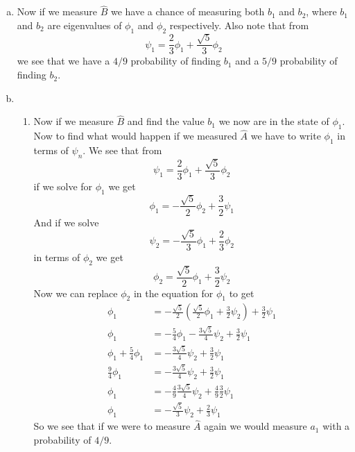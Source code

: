 \documentclass[11pt]{article}
\numberwithin{equation}{section}
\begin{document}
\begin{enumerate}[(a)]
\item
Now if we measure $\hat{B}$ we have a chance of measuring both $b_1$ and $b_2$, where $b_1$ and $b_2$ are eigenvalues of $\phi_1$ and $\phi_2$ respectively. Also note that from 
$$\psi_1 = \frac{2}{3}\phi_1+\frac{\sqrt{5}}{3}\phi_2$$
we see that we have a $4/9$ probability of finding $b_1$ and a $5/9$ probability of finding $b_2$.

\item
\begin{enumerate}[i]
\item
Now if we measure $\hat{B}$ and find the value $b_1$ we now are in the state of $\phi_1$. Now to find what would happen if we measured $\hat{A}$ we have to write $\phi_1$ in terms of $\psi_n$. We see that from
$$\psi_1 = \frac{2}{3}\phi_1+\frac{\sqrt{5}}{3}\phi_2$$
if we solve for $\phi_1$ we get
$$\phi_1 = -\frac{\sqrt{5}}{2}\phi_2 + \frac{3}{2}\psi_1$$
And if we solve 
$$\psi_2 = -\frac{\sqrt{5}}{3}\phi_1+\frac{2}{3}\phi_2$$
in terms of $\phi_2$ we get
$$\phi_2 = \frac{\sqrt{5}}{2}\phi_1 + \frac{3}{2}\psi_2$$
Now we can replace $\phi_2$ in the equation for $\phi_1$ to get
\begin{align*}
\phi_1 &= -\frac{\sqrt{5}}{2}\left(\frac{\sqrt{5}}{2}\phi_1 + \frac{3}{2}\psi_2\right) + \frac{3}{2}\psi_1\\
\phi_1 &= -\frac{5}{4}\phi_1 - \frac{3\sqrt{5}}{4}\psi_2 + \frac{3}{2}\psi_1\\
\phi_1  +\frac{5}{4}\phi_1 &= - \frac{3\sqrt{5}}{4}\psi_2 + \frac{3}{2}\psi_1\\
\frac{9}{4}\phi_1 &= -\frac{3\sqrt{5}}{4}\psi_2 + \frac{3}{2}\psi_1\\
\phi_1 &= -\frac{4}{9}\frac{3\sqrt{5}}{4}\psi_2 + \frac{4}{9}\frac{3}{2}\psi_1\\
\phi_1 &= -\frac{\sqrt{5}}{3}\psi_2 + \frac{2}{3}\psi_1
\end{align*}
So we see that if we were to measure $\hat{A}$ again we would measure $a_1$ with a probability of $4/9$.


\end{enumerate}
\end{enumerate}
\end{document}

